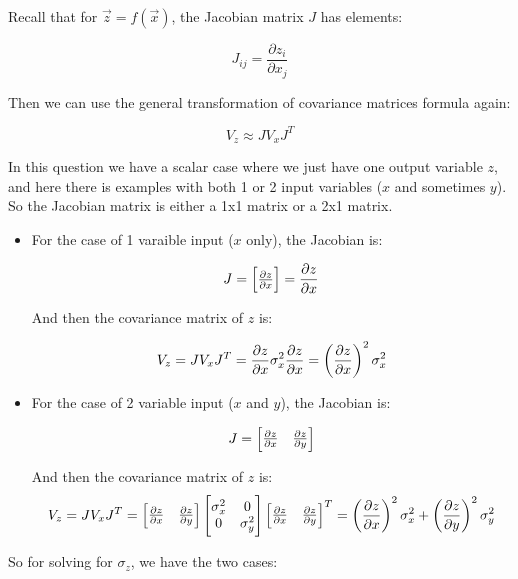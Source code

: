 \documentclass[10pt]{article}
\begin{document}
\divider

Recall that for $\vec{z} = f(\vec{x})$, the Jacobian matrix $J$ has elements:

\[ J_{ij} = \frac{\partial z_i}{\partial x_j} \]

Then we can use the general transformation of covariance matrices formula again:

\[ V_z \approx J V_x J^T \]


In this question we have a scalar case where we just have one output variable $z$, and here there is examples with both 1 or 2 input variables ($x$ and sometimes $y$). So the Jacobian matrix is either a 1x1 matrix or a 2x1 matrix.

\begin{itemize}
	\item For the case of 1 varaible input ($x$ only), the Jacobian is:

	      \[ J = \begin{bmatrix}
			      \pdv{z}{x}
		      \end{bmatrix} = \pdv{z}{x} \]

	      And then the covariance matrix of $z$ is:

	      \[ V_z = J V_x J^T = \pdv{z}{x} \sigma_x^2 \pdv{z}{x} = \left(\pdv{z}{x}\right)^2 \sigma_x^2 \]

	\item For the case of 2 variable input ($x$ and $y$), the Jacobian is:

	      \[ J = \begin{bmatrix}
			      \pdv{z}{x} & \pdv{z}{y}
		      \end{bmatrix} \]


	      And then the covariance matrix of $z$ is:
	      \[ V_z = J V_x J^T = \begin{bmatrix}
			      \pdv{z}{x} & \pdv{z}{y}
		      \end{bmatrix} \begin{bmatrix}
			      \sigma_x^2 & 0          \\
			      0          & \sigma_y^2
		      \end{bmatrix} \begin{bmatrix}
			      \pdv{z}{x} & \pdv{z}{y}
		      \end{bmatrix}^T =
		      \left(\pdv{z}{x}\right)^2 \sigma_x^2 + \left(\pdv{z}{y}\right)^2 \sigma_y^2
	      \]
\end{itemize}


So for solving for $\sigma_z$, we have the two cases:
\end{document}
